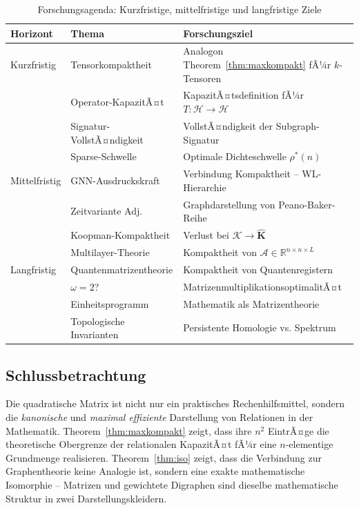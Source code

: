 ﻿\documentclass[12pt, a4paper]{article}
\theoremstyle{definition}
\theoremstyle{remark}
\newcommand{\R}{\mathbb{R}}
\newcommand{\vK}{\bm{K}}
\begin{document}
\begin{table}[H]
\centering
\caption{Forschungsagenda: Kurzfristige, mittelfristige und langfristige Ziele}
\label{tab:agenda}
\begin{tabular}{>{\raggedright\arraybackslash}p{2.5cm}
                >{\raggedright\arraybackslash}p{5.0cm}
                >{\raggedright\arraybackslash}p{5.5cm}}
\toprule
\textbf{Horizont} & \textbf{Thema} & \textbf{Forschungsziel} \\
\midrule
Kurzfristig & Tensorkompaktheit & Analogon Theorem~\ref{thm:maxkompakt} fÃ¼r $k$-Tensoren \\
 & Operator-KapazitÃ¤t & KapazitÃ¤tsdefinition fÃ¼r $T: \mathcal{H} \to \mathcal{H}$ \\
 & Signatur-VollstÃ¤ndigkeit & VollstÃ¤ndigkeit der Subgraph-Signatur \citep{epp2026subgraph} \\
 & Sparse-Schwelle & Optimale Dichteschwelle $\rho^*(n)$ \\
\midrule
Mittelfristig & GNN-Ausdruckskraft & Verbindung Kompaktheit -- WL-Hierarchie \\
 & Zeitvariante Adj. & Graphdarstellung von Peano-Baker-Reihe \\
 & Koopman-Kompaktheit & Verlust bei $\mathcal{K} \to \hat{\vK}$ \\
 & Multilayer-Theorie & Kompaktheit von $\mathcal{A} \in \R^{n \times n \times L}$ \\
\midrule
Langfristig & Quantenmatrizentheorie & Kompaktheit von Quantenregistern \\
 & $\omega = 2$? & MatrizenmultiplikationsoptimalitÃ¤t \\
 & Einheitsprogramm & Mathematik als Matrizentheorie \\
 & Topologische Invarianten & Persistente Homologie vs. Spektrum \\
\bottomrule
\end{tabular}
\end{table}

\subsection{Schlussbetrachtung}
\label{subsec:schluss}

Die quadratische Matrix ist nicht nur ein praktisches Rechenhilfsmittel,
sondern die \emph{kanonische} und \emph{maximal effiziente} Darstellung
von Relationen in der Mathematik. Theorem~\ref{thm:maxkompakt} zeigt,
dass ihre $n^2$ EintrÃ¤ge die theoretische Obergrenze der relationalen
KapazitÃ¤t fÃ¼r eine $n$-elementige Grundmenge realisieren. Theorem~\ref{thm:iso}
zeigt, dass die Verbindung zur Graphentheorie keine Analogie ist, sondern
eine exakte mathematische Isomorphie -- Matrizen und gewichtete Digraphen
sind dieselbe mathematische Struktur in zwei Darstellungskleidern.
\end{document}
